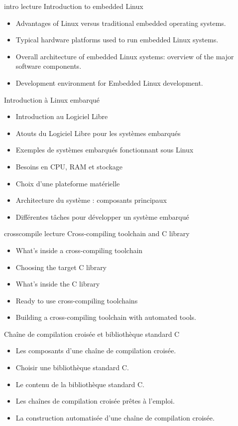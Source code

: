 {intro}
{lecture}
{Introduction to embedded Linux}
{
  \begin{itemize}
  \item Advantages of Linux versus traditional embedded operating
    systems.
  \item Typical hardware platforms used to run embedded Linux systems.
  \item Overall architecture of embedded Linux systems: overview of
    the major software components.
  \item Development environment for Embedded Linux development.
  \end{itemize}
}
{Introduction à Linux embarqué}
{
  \begin{itemize}
  \item Introduction au Logiciel Libre
  \item Atouts du Logiciel Libre pour les systèmes embarqués
  \item Exemples de systèmes embarqués fonctionnant sous Linux
  \item Besoins en CPU, RAM et stockage
  \item Choix d'une plateforme matérielle
  \item Architecture du système : composants principaux
  \item Différentes tâches pour développer un système embarqué
  \end{itemize}
}
{crosscompile}
{lecture}
{Cross-compiling toolchain and C library}
{
  \begin{itemize}
  \item What's inside a cross-compiling toolchain
  \item Choosing the target C library
  \item What's inside the C library
  \item Ready to use cross-compiling toolchains
  \item Building a cross-compiling toolchain with automated tools.
  \end{itemize}
}
{Chaîne de compilation croisée et bibliothèque standard C}
{
  \begin{itemize}
  \item Les composants d'une chaîne de compilation croisée.
  \item Choisir une bibliothèque standard C.
  \item Le contenu de la bibliothèque standard C.
  \item Les chaînes de compilation croisée prêtes à l'emploi.
  \item La construction automatisée d'une chaîne de compilation croisée.
  \end{itemize}
}
